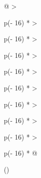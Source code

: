 \documentclass[
]{article}
\begin{document}
\begin{longtable}[]{@{}
  >{\raggedright\arraybackslash}p{(\columnwidth - 16\tabcolsep) * }
  >{\raggedright\arraybackslash}p{(\columnwidth - 16\tabcolsep) * }
  >{\raggedright\arraybackslash}p{(\columnwidth - 16\tabcolsep) * }
  >{\raggedright\arraybackslash}p{(\columnwidth - 16\tabcolsep) * }
  >{\raggedright\arraybackslash}p{(\columnwidth - 16\tabcolsep) * }
  >{\raggedright\arraybackslash}p{(\columnwidth - 16\tabcolsep) * }
  >{\raggedright\arraybackslash}p{(\columnwidth - 16\tabcolsep) * }
  >{\raggedright\arraybackslash}p{(\columnwidth - 16\tabcolsep) * }
  >{\raggedright\arraybackslash}p{(\columnwidth - 16\tabcolsep) * }@{}}
\toprule()
\end{longtable}
\end{document}

